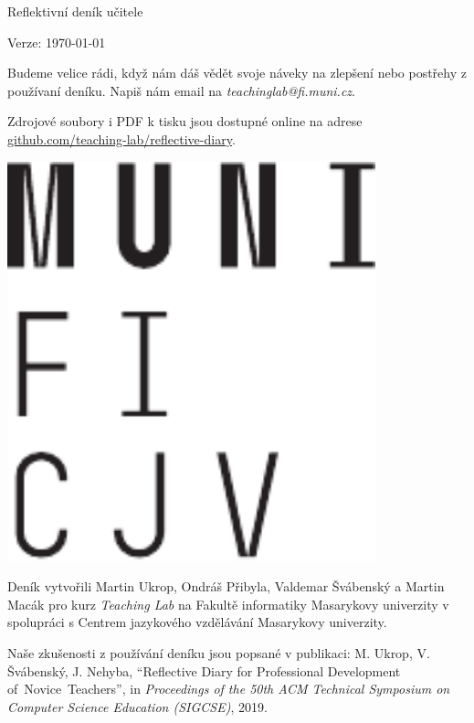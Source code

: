 \documentclass[twoside,openany]{book}
\begin{document}







\newpage
\vspace*{\fill}
Reflektivní deník učitele

Verze: \today

\bigskip
Budeme velice rádi, když nám dáš vědět svoje náveky na zlepšení nebo postřehy z používaní deníku. Napiš nám email na \textit{teachinglab@fi.muni.cz}.

Zdrojové soubory i PDF k tisku jsou dostupné online na adrese \url{github.com/teaching-lab/reflective-diary}.

\medskip
\begin{minipage}{0.28\textwidth}
	\includegraphics[width=0.80\textwidth]{../img/muni}\hfill
	\end{minipage}
\begin{minipage}{0.72\textwidth}
Deník vytvořili Martin Ukrop, Ondráš Přibyla, Valdemar Švábenský a Martin Macák pro kurz \textit{Teaching Lab} na Fakultě informatiky Masarykovy univerzity v spolupráci s Centrem jazykového vzdělávání Masarykovy univerzity.
\end{minipage}

\medskip
Naše zkušenosti z používání deníku jsou popsané v publikaci: M. Ukrop, V. Švábenský, J. Nehyba, \enquote{Reflective Diary for Professional Development of~Novice~Teachers}, in \textit{Proceedings of the 50th ACM Technical Symposium on Computer Science Education (SIGCSE)}, 2019.
\end{document}
